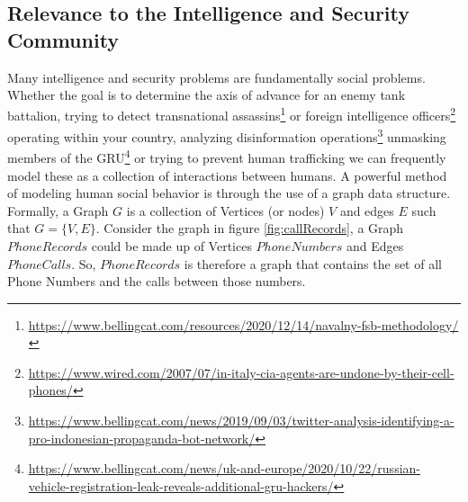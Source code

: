 \documentclass[letterpaper, 10pt]{article}
\begin{document}
\begin{multicols}{2}
        \subsection{Relevance to the Intelligence and Security Community} \label{section:relevance}
        
        \par{Many intelligence and security problems are fundamentally social problems. 
        Whether the goal is to determine the axis of advance for an enemy tank battalion, trying to detect transnational assassins\footnote{\href{https://www.bellingcat.com/resources/2020/12/14/navalny-fsb-methodology/}{https://www.bellingcat.com/resources/2020/12/14/navalny-fsb-methodology/}} or foreign intelligence officers\footnote{\href{https://www.wired.com/2007/07/in-italy-cia-agents-are-undone-by-their-cell-phones/}{https://www.wired.com/2007/07/in-italy-cia-agents-are-undone-by-their-cell-phones/}} operating within your country, analyzing disinformation operations\footnote{\href{https://www.bellingcat.com/news/2019/09/03/twitter-analysis-identifying-a-pro-indonesian-propaganda-bot-network/}{https://www.bellingcat.com/news/2019/09/03/twitter-analysis-identifying-a-pro-indonesian-propaganda-bot-network/}} unmasking members of the GRU\footnote{\href{https://www.bellingcat.com/news/uk-and-europe/2020/10/22/russian-vehicle-registration-leak-reveals-additional-gru-hackers/}{https://www.bellingcat.com/news/uk-and-europe/2020/10/22/russian-vehicle-registration-leak-reveals-additional-gru-hackers/}} or trying to prevent human trafficking \cite{Szekely2015} we can frequently model these as a collection of interactions between humans. 
        A powerful method of modeling human social behavior is through the use of a graph data structure.
        Formally, a Graph $G$ is a collection of Vertices (or nodes) $V$ and edges $E$ such that $G=\{V,E\}$.
        Consider the graph in figure \ref{fig:callRecords}, a Graph $PhoneRecords$ could be made up of Vertices $PhoneNumbers$ and Edges $PhoneCalls$.
        So, $PhoneRecords$ is therefore a graph that contains the set of all Phone Numbers and the calls between those numbers.}


\end{multicols}
\end{document}
